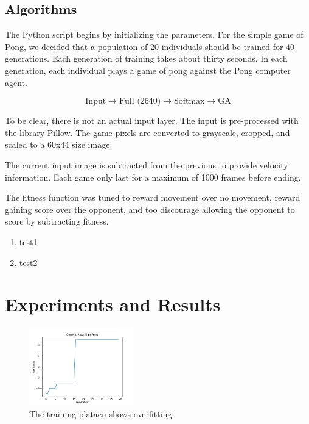 \documentclass[conference]{IEEEtran}
\begin{document}
\subsection{Algorithms}

The Python script begins by initializing the parameters. For the simple game of Pong, we decided that a population of 20 individuals should be trained for 40 generations. Each generation of training takes about thirty seconds. In each generation, each individual plays a game of pong against the Pong computer agent. 

\begin{equation}\label{arch}
\text{Input} \rightarrow \text{Full (2640)} \rightarrow \text{Softmax} \rightarrow \text{GA}
\end{equation}

To be clear, there is not an actual input layer. The input is pre-processed with the library Pillow. The game pixels are converted to grayscale, cropped, and scaled to a 60x44 size image.

The current input image is subtracted from the previous to provide velocity information. Each game only last for a maximum of 1000 frames before ending.

The fitness function was tuned to reward movement over no movement, reward gaining score over the opponent, and too discourage allowing the opponent to score by subtracting fitness.

\begin{enumerate}
\item test1
\item test2
\end{enumerate}


\section{Experiments and Results}

\begin{figure}[htbp]
\centerline{\includegraphics[width=0.4\textwidth]{GNN_figure.png}}
\caption{The training plataeu shows overfitting.}
\label{overfitting}
\end{figure}
\end{document}
